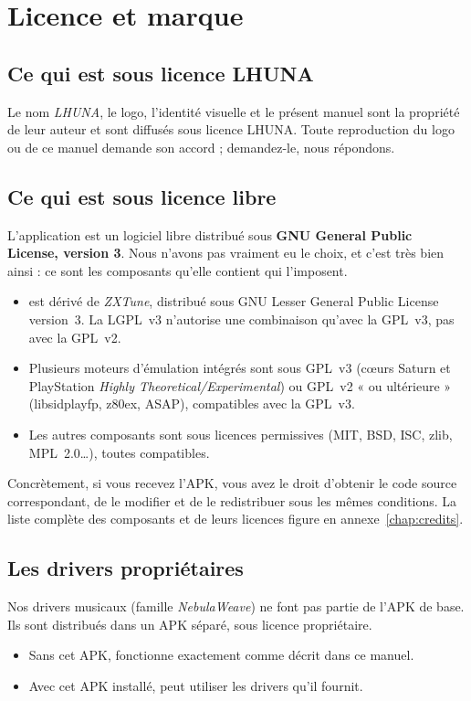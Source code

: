 \chapter*{Licence et marque}

\section*{Ce qui est sous licence LHUNA}
Le nom \emph{LHUNA}, le logo, l'identité visuelle et le présent manuel sont la propriété de leur auteur et sont
diffusés sous licence LHUNA. Toute reproduction du logo ou de ce manuel demande son accord ; demandez-le, nous répondons.

\section*{Ce qui est sous licence libre}
L'application \soft{} est un logiciel libre distribué sous \textbf{GNU General Public License, version 3}. Nous n'avons pas
vraiment eu le choix, et c'est très bien ainsi : ce sont les composants qu'elle contient qui l'imposent.
\begin{itemize}
  \item \soft{} est dérivé de \emph{ZXTune}, distribué sous GNU Lesser General Public License version~3.
        La LGPL~v3 n'autorise une combinaison qu'avec la GPL~v3, pas avec la GPL~v2.
  \item Plusieurs moteurs d'émulation intégrés sont sous GPL~v3 (cœurs Saturn et PlayStation
        \emph{Highly Theoretical/Experimental}) ou GPL~v2 « ou ultérieure » (libsidplayfp, z80ex, ASAP), compatibles
        avec la GPL~v3.
  \item Les autres composants sont sous licences permissives (MIT, BSD, ISC, zlib, MPL~2.0…), toutes compatibles.
\end{itemize}
Concrètement, si vous recevez l'APK, vous avez le droit d'obtenir le code source correspondant, de le modifier et de le
redistribuer sous les mêmes conditions. La liste complète des composants et de leurs licences figure en
annexe~\ref{chap:credits}.

\section*{Les drivers propriétaires}
Nos drivers musicaux (famille \emph{NebulaWeave}) ne font pas partie de l'APK de base. Ils sont
distribués dans un APK séparé, sous licence propriétaire.
\begin{itemize}
  \item Sans cet APK, \soft{} fonctionne exactement comme décrit dans ce manuel.
  \item Avec cet APK installé, \soft{} peut utiliser les drivers qu'il fournit.
\end{itemize}

